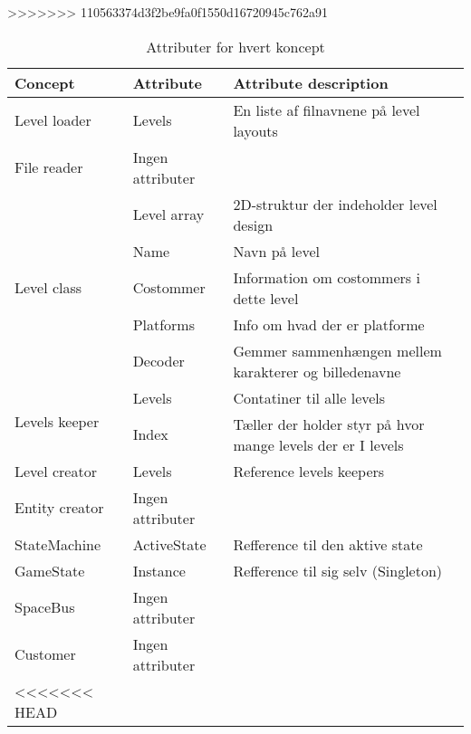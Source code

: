 >>>>>>> 110563374d3f2be9fa0f1550d16720945c762a91
\begin{table}[!h]
\hspace{-50pt}
\begin{tabular}{|l|l|l|}
\hline
\textbf{Concept}               & \textbf{Attribute} & \textbf{Attribute description}                              \\ \hline
Level loader                   & Levels             & En liste af filnavnene på level layouts                     \\ \hline
File reader                    & Ingen attributer   &                                                             \\ \hline
\multirow{5}{*}{Level class}   & Level array        & 2D-struktur der indeholder level design                     \\ \cline{2-3}
                               & Name               & Navn på level                                               \\ \cline{2-3}
                               & Costommer          & Information om costommers i dette level                     \\ \cline{2-3}
                               & Platforms          & Info om hvad der er platforme                               \\ \cline{2-3}
                               & Decoder            & Gemmer sammenhængen mellem karakterer og billedenavne       \\ \hline
\multirow{2}{*}{Levels keeper} & Levels             & Contatiner til alle levels                                  \\ \cline{2-3}
                               & Index              & Tæller der holder styr på hvor mange levels der er I levels \\ \hline
Level creator                  & Levels             & Reference levels keepers                                    \\ \hline
Entity creator                 & Ingen attributer   &                                                             \\ \hline
StateMachine & ActiveState & Refference til den aktive state \\\hline
GameState & Instance & Refference til sig selv (Singleton)\\\hline
SpaceBus & Ingen attributer & \\\hline
Customer & Ingen attributer & \\\hline
<<<<<<< HEAD
\end{tabular}
\caption{Attributer for hvert koncept}
\label{attributes}
\end{table}\\

